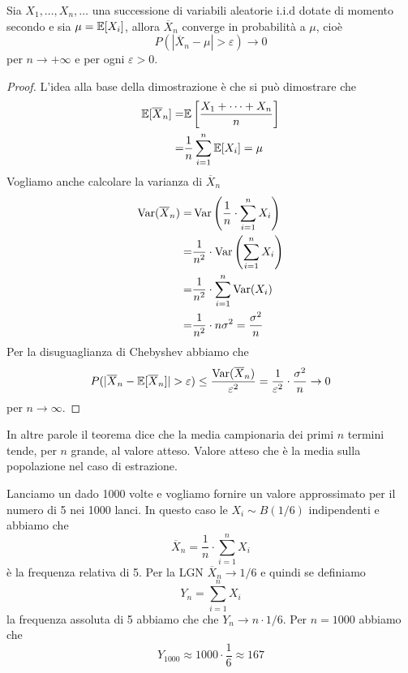 \begin{theorem}
	Sia $X_1, \dots, X_n, \dots$ una successione di variabili aleatorie i.i.d dotate di momento
	secondo e sia $\mu = \mathbb{E}[X_i]$, allora $\overline{X}_n$ converge in probabilità a $\mu$, cioè
	\[ P(|\overline{X}_n - \mu| > \varepsilon) \to 0 \]
	per $n \to +\infty$ e per ogni $\varepsilon > 0$.
	\begin{proof}
		L'idea alla base della dimostrazione è che si può dimostrare che
		\begin{align*}
			\mathbb{E}[\overline{X}_n] = & \mathbb{E}\left[ \frac{X_1 + \dots + X_n}{n} \right] \\
			=                    & \frac{1}{n} \sum_{i=1}^n \mathbb{E}[X_i] = \mu
		\end{align*}
		Vogliamo anche calcolare la varianza di $\overline{X}_n$
		\begin{align*}
			\operatorname{Var}(\overline{X}_n) = & \operatorname{Var} \left( \frac{1}{n} \cdot \sum_{i=1}^n X_i \right)   \\
			=                      & \frac{1}{n^2} \cdot \operatorname{Var} \left( \sum_{i=1}^n X_i \right) \\
			=                      & \frac{1}{n^2} \cdot \sum_{i=1}^n \operatorname{Var}(X_i)               \\
			=                      & \frac{1}{n^2} \cdot n \sigma^2 = \frac{\sigma^2}{n}
		\end{align*}
		Per la disuguaglianza di Chebyshev abbiamo che
		\[
			P(|\overline{X}_n - \mathbb{E}[\overline{X}_n]| >
			\varepsilon) \leq \frac{\operatorname{Var}(\overline{X}_n)}{\varepsilon^2} =
			\frac{1}{\varepsilon^2} \cdot \frac{\sigma^2}{n} \to 0
		\]
		per $n \to \infty$.
	\end{proof}
\end{theorem}

In altre parole il teorema dice che la media campionaria dei primi $n$ termini tende, per $n$
grande, al valore atteso. Valore atteso che è la media sulla popolazione nel caso di estrazione.

\begin{example}
	Lanciamo un dado 1000 volte e vogliamo fornire un valore approssimato per il numero di 5 nei
	1000 lanci. In questo caso le $X_i \sim B(1/6)$ indipendenti e abbiamo che
	\[ \overline{X}_n = \frac{1}{n} \cdot \sum_{i=1}^{n} X_i \]
	è la frequenza relativa di 5. Per la LGN $\overline{X}_n \to 1/6$ e quindi se definiamo
	\[ Y_n = \sum_{i=1}^{n} X_i \]
	la frequenza assoluta di 5 abbiamo che che $Y_n \to n \cdot 1/6$. Per $n=1000$ abbiamo che
	\[ Y_{1000} \approx 1000 \cdot \frac{1}{6} \approx 167 \]
\end{example}

